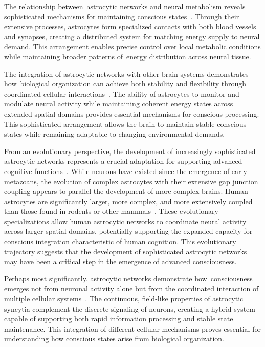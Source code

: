 The relationship between~astrocytic networks and neural metabolism reveals sophisticated mechanisms for maintaining conscious states~\cite{Parpura2012, Pellerin2012}. Through their extensive processes, astrocytes form specialized contacts with both blood vessels and synapses, creating a distributed system for matching energy supply to neural demand. This arrangement enables precise control over local metabolic conditions while maintaining broader patterns of~energy distribution across neural tissue.

The integration of astrocytic networks with other brain systems demonstrates how~biological organization can achieve both stability and flexibility through coordinated cellular interactions~\cite{Khakh2015, Rusakov2015}. The ability of astrocytes to monitor and modulate neural activity while maintaining coherent energy states across extended spatial domains provides essential mechanisms for conscious processing. This sophisticated arrangement allows the brain to maintain stable conscious states while remaining adaptable to changing environmental demands.

From an evolutionary perspective, the development of increasingly sophisticated astrocytic networks represents a crucial adaptation for supporting advanced cognitive functions~\cite{Oberheim2012, Verkhratsky2018}. While neurons have existed since the emergence of early metazoans, the evolution of complex astrocytes with their extensive gap junction coupling appears to parallel the development of more complex brains. Human astrocytes are significantly larger, more complex, and more extensively coupled than those found in rodents or other mammals~\cite{Oberheim2012}. These evolutionary specializations allow human astrocytic networks to coordinate neural activity across larger spatial domains, potentially supporting the expanded capacity for conscious integration characteristic of human cognition. This evolutionary trajectory suggests that the development of sophisticated astrocytic networks may have been a critical step in the emergence of advanced consciousness.

Perhaps most significantly, astrocytic networks demonstrate how~consciousness emerges not from neuronal activity alone but from the coordinated interaction of multiple cellular systems~\cite{Nedergaard2003, Verkhratsky2018}. The continuous, field-like properties of astrocytic syncytia complement the discrete signaling of neurons, creating a hybrid system capable of supporting both rapid information processing and stable state maintenance. This integration of different cellular mechanisms proves essential for understanding how conscious states arise from biological organization.


